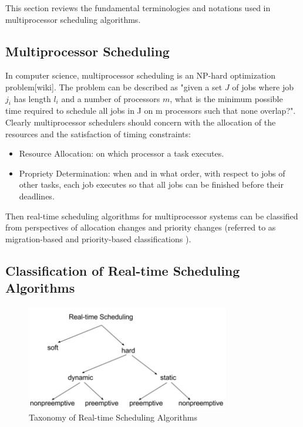 \documentclass[preprint,12pt]{elsarticle}
\begin{document}
This section reviews the fundamental terminologies and notations used in multiprocessor scheduling algorithms.

\subsection{Multiprocessor Scheduling}

In computer science, multiprocessor scheduling is an NP-hard optimization problem[wiki]. The problem can be described as "given a set $J$ of jobs where job $j_i$ has length $l_i$ and a number of processors $m$, what is the minimum possible time required to schedule all jobs in J on m processors such that none overlap?"\cite{garey1979computers}. Clearly multiprocessor schedulers should concern with the allocation of the resources and the satisfaction of timing constraints\cite{davis2011survey}:

\begin{itemize}

\item Resource Allocation: on which processor a task executes.
\item Propriety Determination: when and in what order, with respect to jobs of other tasks, each job executes so that all jobs can be finished before their deadlines.

\end{itemize}

Then real-time scheduling algorithms for multiprocessor systems can be classified from perspectives of allocation changes and priority changes (referred to as migration-based and priority-based classifications \cite{carpenter2004categorization}).

\subsection{Classification of Real-time Scheduling Algorithms}

\begin{figure}
\centering
\includegraphics[width=3.5in]{classification}
\caption{Taxonomy of Real-time Scheduling Algorithms}
\label{classification}
\end{figure}
\end{document}
